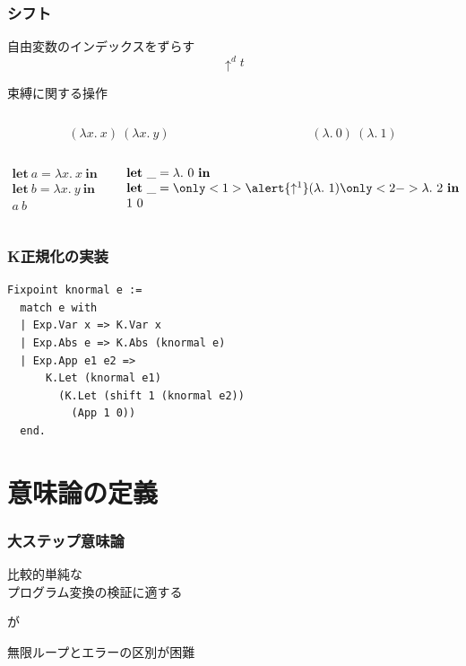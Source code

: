 \documentclass[dvipdfmx,cjk,xcolor=dvipsnames,envcountsect,notheorems,12pt]{beamer}
\theoremstyle{definition}
\newcommand{\keyword}[1]{\mathbf{#1}}
\newcommand{\LET}{\keyword{let}}
\newcommand{\IN}{\keyword{in}}
\begin{document}
\begin{frame}
	\frametitle{シフト}
	\LARGE 自由変数のインデックスをずらす
	\[\uparrow^d t \]

	束縛に関する操作
	{\large \begin{columns}
		\begin{column}{0.5\textwidth}
			\[ (\lambda x.~x)~(\lambda x.~y) \]
		\end{column}
		\begin{column}{0.5\textwidth}
			\[ (\lambda.~0)~(\lambda.~1) \]
		\end{column}
	\end{columns}

	\vfill

	\begin{columns}
		\begin{column}{0.5\textwidth}
			\[ 
					\begin{array}{l}
						\LET~a = \lambda x.~x~\IN \\
						\LET~b = \lambda x.~y~\IN \\
						a~b
					\end{array}
			\]
		\end{column}
		\begin{column}{0.5\textwidth}
			\[
				\begin{array}{l}
					\LET~\_ = \lambda.~0~\IN \\
					\LET~\_ = \only<1>{\alert{\uparrow^1}(\lambda.~1)}\only<2->{\lambda.~2}~\IN \\
					1~0
				\end{array}
			\]
		\end{column}
	\end{columns}}
	\pause
\end{frame}

\begin{frame}[fragile]
	\frametitle{K正規化の実装}
\begin{lstlisting}[basicstyle={\ttfamily\normalsize}]
Fixpoint knormal e :=
  match e with
  | Exp.Var x => K.Var x
  | Exp.Abs e => K.Abs (knormal e)
  | Exp.App e1 e2 =>
      K.Let (knormal e1)
        (K.Let (shift 1 (knormal e2))
          (App 1 0))
  end.
\end{lstlisting}
\end{frame}

\section{意味論の定義}

\begin{frame}
	\frametitle{大ステップ意味論}
	\LARGE
	\begin{center}
	比較的単純な\\プログラム変換の検証に適する

	\vfill

	が

	\vfill

	無限ループとエラーの区別が困難
	\end{center}
\end{frame}
\end{document}
